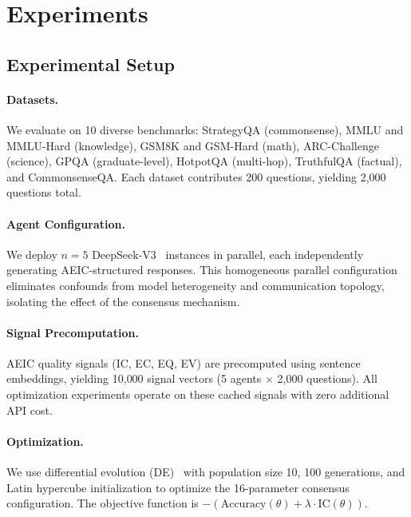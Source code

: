 \documentclass[runningheads]{llncs}
\begin{document}
\section{Experiments}
\label{sec:exp}

\subsection{Experimental Setup}

\paragraph{Datasets.} We evaluate on 10 diverse benchmarks: StrategyQA (commonsense), MMLU and MMLU-Hard (knowledge), GSM8K and GSM-Hard (math), ARC-Challenge (science), GPQA (graduate-level), HotpotQA (multi-hop), TruthfulQA (factual), and CommonsenseQA. Each dataset contributes 200 questions, yielding 2{,}000 questions total.

\paragraph{Agent Configuration.} We deploy $n=5$ DeepSeek-V3~\cite{deepseek2024v3} instances in parallel, each independently generating AEIC-structured responses. This homogeneous parallel configuration eliminates confounds from model heterogeneity and communication topology, isolating the effect of the consensus mechanism.

\paragraph{Signal Precomputation.} AEIC quality signals (IC, EC, EQ, EV) are precomputed using sentence embeddings, yielding 10{,}000 signal vectors (5 agents $\times$ 2{,}000 questions). All optimization experiments operate on these cached signals with zero additional API cost.

\paragraph{Optimization.} We use differential evolution (DE)~\cite{storn1997differential} with population size 10, 100 generations, and Latin hypercube initialization to optimize the 16-parameter consensus configuration. The objective function is $-(\text{Accuracy}(\theta) + \lambda \cdot \text{IC}(\theta))$.
\end{document}
